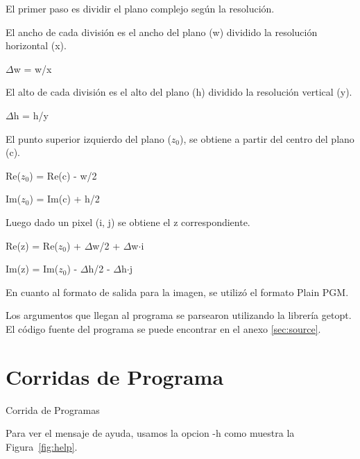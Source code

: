 \documentclass{article}
\begin{document}
El primer paso es dividir el plano complejo según la resolución. 

El ancho de cada división es el ancho del plano (w) dividido la resolución horizontal (x).

$\Delta$w = w/x

El alto de cada división es el alto del plano (h) dividido la resolución vertical (y).

$\Delta$h = h/y

El punto superior izquierdo del plano ($z_{0}$), se obtiene a partir del centro del plano (c).

Re($z_{0}$) = Re(c) - w/2

Im($z_{0}$) = Im(c) + h/2

Luego dado un pixel (i, j) se obtiene el z correspondiente.

Re(z) = Re($z_{0}$) + $\Delta$w/2 + $\Delta$w$\cdot$i

Im(z) = Im($z_{0}$) - $\Delta$h/2 - $\Delta$h$\cdot$j

En cuanto al formato de salida para la imagen, se utilizó el formato Plain PGM.

Los argumentos que llegan al programa se parsearon utilizando la librería getopt. 
El código fuente del programa se puede encontrar en el anexo \ref{sec:source}.

\section{Corridas de Programa}

Corrida de Programas

Para ver el mensaje de ayuda, usamos la opcion -h como muestra la Figura~\ref{fig:help}.
\end{document}
